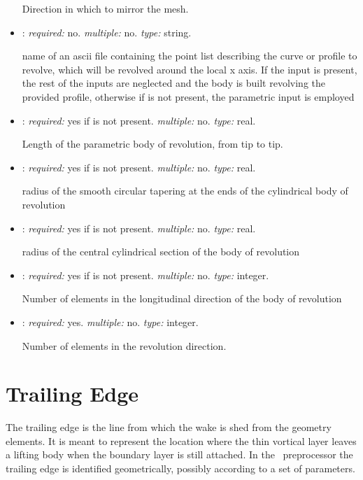 \begin{itemize}
Direction in which to mirror the mesh.

\item {}: \textit{required:} no. \textit{multiple:} no. \textit{type:} string.

name of an ascii file containing the point list describing the curve or profile to revolve, which will be revolved around the local x axis. If the input is present, the rest of the inputs are neglected and the body is built revolving the provided profile, otherwise if   is not present, the parametric input is employed

\item {}: \textit{required:} yes if  is not present. \textit{multiple:} no. \textit{type:} real.

Length of the parametric body of revolution, from tip to tip.

\item {}: \textit{required:} yes if  is not present. \textit{multiple:} no. \textit{type:} real.

radius of the smooth circular tapering at the ends of the cylindrical body of revolution

\item {}: \textit{required:} yes if  is not present. \textit{multiple:} no. \textit{type:} real.

radius of the central cylindrical section of the body of revolution

\item {}: \textit{required:} yes if  is not present. \textit{multiple:} no. \textit{type:} integer.

Number of elements in the longitudinal direction of the body of revolution


\item {}: \textit{required:} yes. \textit{multiple:} no. \textit{type:} integer.

Number of elements in the revolution direction. 


\end{itemize}


\section{Trailing Edge}
\label{sec:TrailingEdge}

The trailing edge is the line from which the wake is shed from the geometry elements. It is meant to represent the location where the thin vortical layer leaves a lifting body when the boundary layer is still attached. In the \DUST \ preprocessor the trailing edge is identified geometrically, possibly according to a set of parameters. 

